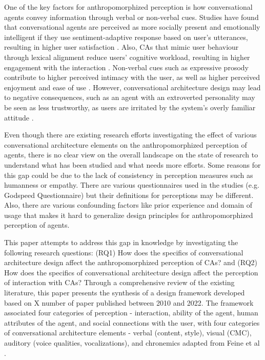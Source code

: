 \documentclass[sigconf,screen,review, anonymous]{acmart}
\begin{document}
One of the key factors for anthropomorphized perception is how conversational agents convey information through verbal or non-verbal cues. Studies have found that conversational agents are perceived as more socially present and emotionally intelligent if they use sentiment-adaptive response based on user's utterances, resulting in higher user satisfaction \cite{diederich2019emulating}\cite{yang2017perceived}. Also, CAs that mimic user behaviour through lexical alignment reduce users' cognitive workload, resulting in higher engagement with the interaction \cite{spillner2021talk}. Non-verbal cues such as expressive prosody contribute to higher perceived intimacy with the user, as well as higher perceived enjoyment and ease of use \cite{kim2020can}. However, conversational architecture design may lead to negative consequences, such as an agent with an extroverted personality may be seen as less trustworthy, as users are irritated by the system's overly familiar attitude \cite{andrews2012system}.

Even though there are existing research efforts investigating the effect of various conversational architecture elements on the anthropomorphized perception of agents, there is no clear view on the overall landscape on the state of research to understand what has been studied and what needs more efforts. Some reasons for this gap could be due to the lack of consistency in perception measures such as humanness or empathy. There are various questionnaires used in the studies (e.g. Godspeed Questionnaire) but their definitions for perceptions may be different. Also, there are various confounding factors like prior experience and domain of usage that makes it hard to generalize design principles for anthropomorphized perception of agents.

This paper attempts to address this gap in knowledge by investigating the following research questions: (RQ1) How does the specifics of conversational architecture design affect the anthropomorphized perception of CAs? and (RQ2) How does the specifics of conversational architecture design affect the perception of interaction with CAs? Through a comprehensive review of the existing literature, this paper presents the synthesis of a design framework developed based on X number of paper published between 2010 and 2022. The framework associated four categories of perception - interaction, ability of the agent, human attributes of the agent, and social connections with the user, with four categories of conversational architecture elements - verbal (content, style), visual (CMC), auditory (voice qualities, vocalizations), and chronemics adapted from Feine et al \cite{feine2019taxonomy}.
\end{document}
